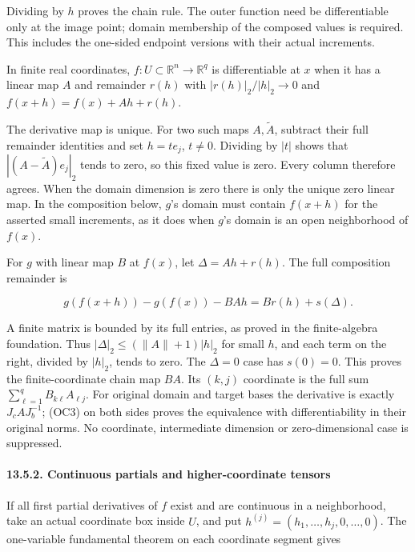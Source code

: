 \documentclass[
  11pt,
]{article}
\begin{document}
Dividing by \(h\) proves the chain rule. The outer function need be
differentiable only at the image point; domain membership of the
composed values is required. This includes the one-sided endpoint
versions with their actual increments.

In finite real coordinates, \(f:U\subset\mathbb R^n\to\mathbb R^q\) is
differentiable at \(x\) when it has a linear map \(A\) and remainder
\(r(h)\) with \(|r(h)|_2/|h|_2\to0\) and \(f(x+h)=f(x)+Ah+r(h)\).

The derivative map is unique. For two such maps \(A,\widetilde A\),
subtract their full remainder identities and set \(h=t e_j\), \(t\ne0\).
Dividing by \(|t|\) shows that \(|(A-\widetilde A)e_j|_2\) tends to
zero, so this fixed value is zero. Every column therefore agrees. When
the domain dimension is zero there is only the unique zero linear map.
In the composition below, \(g\)'s domain must contain \(f(x+h)\) for the
asserted small increments, as it does when \(g\)'s domain is an open
neighborhood of \(f(x)\).

For \(g\) with linear map \(B\) at \(f(x)\), let \(\Delta=Ah+r(h)\). The
full composition remainder is

\[
 g(f(x+h))-g(f(x))-BAh
 =B r(h)+s(\Delta).
\tag{OC18}
\]

A finite matrix is bounded by its full entries, as proved in the
finite-algebra foundation. Thus \(|\Delta|_2\le(\|A\|+1)|h|_2\) for
small \(h\), and each term on the right, divided by \(|h|_2\), tends to
zero. The \(\Delta=0\) case has \(s(0)=0\). This proves the
finite-coordinate chain map \(BA\). Its \((k,j)\) coordinate is the full
sum \(\sum_{\ell=1}^qB_{k\ell}A_{\ell j}\). For original domain and
target bases the derivative is exactly \(J_cAJ_b^{-1}\); (OC3) on both
sides proves the equivalence with differentiability in their original
norms. No coordinate, intermediate dimension or zero-dimensional case is
suppressed.

\paragraph{13.5.2. Continuous partials and higher-coordinate
tensors}\label{continuous-partials-and-higher-coordinate-tensors}

If all first partial derivatives of \(f\) exist and are continuous in a
neighborhood, take an actual coordinate box inside \(U\), and put
\(h^{(j)}=(h_1,\ldots,h_j,0,\ldots,0)\). The one-variable fundamental
theorem on each coordinate segment gives
\end{document}
